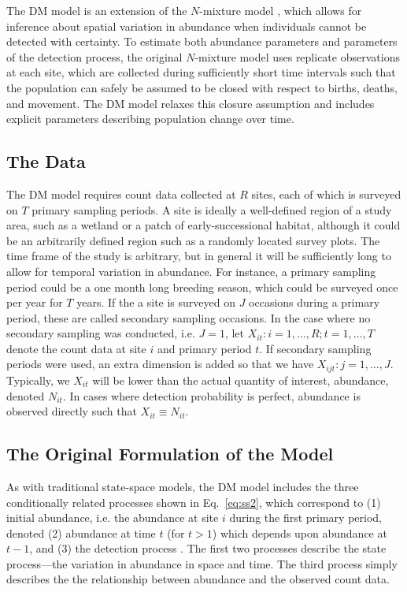 \documentclass[12pt]{article}
\begin{document}
The DM model is an extension of the $N$-mixture model
\citep{royle:2004biom}, which allows for inference about spatial
variation in abundance when individuals cannot be detected with
certainty. To estimate both abundance parameters and parameters
of the detection process, the original $N$-mixture model uses replicate
observations at each site, which are collected during sufficiently
short time intervals such that the population can safely be
assumed to be closed with respect to births, deaths, and movement. The DM
model relaxes this closure assumption and includes explicit parameters
describing population change over time.


\subsection{The Data}

The DM model requires count data collected at $R$ sites, each of
which is surveyed on $T$ primary sampling periods. A site is ideally a
well-defined region of a study area, such as a wetland or a
patch of early-successional habitat, although it could be an arbitrarily
defined region such as a randomly located survey plots. The time
frame of the study is arbitrary, but in general
it will be sufficiently long to allow for temporal variation in
abundance. For instance, a primary sampling period could be a
one month long breeding season, which could be surveyed once per
year for $T$ years. If the a site is surveyed on $J$ occasions during a
primary period, these are called secondary sampling occasions.
In the case where no secondary sampling was conducted, i.e.
$J=1$, let $X_{it}: i=1,\hdots,R; t=1,\hdots,T$ denote the count data
at site $i$ and primary period $t$. If secondary sampling periods were
used, an extra dimension is added so that we have $X_{ijt}:
j=1,\hdots,J$. Typically, we $X_{it}$ will be lower than the
actual quantity of interest, abundance,
denoted $N_{it}$. In cases where detection probability is perfect,
abundance is observed directly such that $X_{it} \equiv N_{it}$.

\subsection{The Original Formulation of the Model}

As with traditional state-space models, the DM model includes the
three conditionally related processes shown in Eq.~\ref{eq:ss2},
which correspond to (1) initial abundance, i.e. the
abundance at site $i$ during the first primary period,
denoted (2) abundance at time $t$ (for $t>1$) which depends upon
abundance at $t-1$, and (3) the
detection process \citep{dail_madsen:2011}.
The first two processes describe the state process---the
variation in abundance in space and time. The third process
simply describes the the relationship between
abundance and the observed count data.
\end{document}
